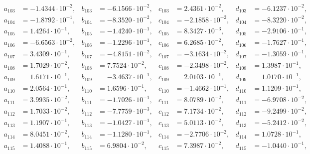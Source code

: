 \begin{align*}
  a_{ 103 } &= -1.4344 \cdot 10^{ -2 }, & b_{ 103 } &= -6.1566 \cdot 10^{ -2 }, & c_{ 103 } &= 2.4361 \cdot 10^{ -2 }, & d_{ 103 } &= -6.1237 \cdot 10^{ -2 }, \\ 
  a_{ 104 } &= -1.8792 \cdot 10^{ -1 }, & b_{ 104 } &= -8.3520 \cdot 10^{ -2 }, & c_{ 104 } &= -2.1858 \cdot 10^{ -2 }, & d_{ 104 } &= -8.3220 \cdot 10^{ -2 }, \\ 
  a_{ 105 } &= 1.4264 \cdot 10^{ -1 }, & b_{ 105 } &= -1.4240 \cdot 10^{ -1 }, & c_{ 105 } &= 8.3427 \cdot 10^{ -3 }, & d_{ 105 } &= -2.9106 \cdot 10^{ -1 }, \\ 
  a_{ 106 } &= -6.6563 \cdot 10^{ -2 }, & b_{ 106 } &= -1.2296 \cdot 10^{ -1 }, & c_{ 106 } &= 6.2685 \cdot 10^{ -2 }, & d_{ 106 } &= -1.7627 \cdot 10^{ -1 }, \\ 
  a_{ 107 } &= 3.4309 \cdot 10^{ -1 }, & b_{ 107 } &= -4.8151 \cdot 10^{ -2 }, & c_{ 107 } &= -3.1634 \cdot 10^{ -2 }, & d_{ 107 } &= -1.3059 \cdot 10^{ -1 }, \\ 
  a_{ 108 } &= 1.7029 \cdot 10^{ -2 }, & b_{ 108 } &= 7.7524 \cdot 10^{ -2 }, & c_{ 108 } &= -2.3498 \cdot 10^{ -2 }, & d_{ 108 } &= 1.3987 \cdot 10^{ -1 }, \\ 
  a_{ 109 } &= 1.6171 \cdot 10^{ -1 }, & b_{ 109 } &= -3.4637 \cdot 10^{ -1 }, & c_{ 109 } &= 2.0103 \cdot 10^{ -1 }, & d_{ 109 } &= 1.0170 \cdot 10^{ -1 }, \\ 
  a_{ 110 } &= 2.0564 \cdot 10^{ -1 }, & b_{ 110 } &= 1.6596 \cdot 10^{ -1 }, & c_{ 110 } &= -1.4662 \cdot 10^{ -1 }, & d_{ 110 } &= 1.1209 \cdot 10^{ -1 }, \\ 
  a_{ 111 } &= 3.9935 \cdot 10^{ -2 }, & b_{ 111 } &= -1.7026 \cdot 10^{ -1 }, & c_{ 111 } &= 8.0789 \cdot 10^{ -2 }, & d_{ 111 } &= -6.9708 \cdot 10^{ -2 }, \\ 
  a_{ 112 } &= 1.7033 \cdot 10^{ -2 }, & b_{ 112 } &= -7.7759 \cdot 10^{ -3 }, & c_{ 112 } &= 7.1734 \cdot 10^{ -2 }, & d_{ 112 } &= -9.2499 \cdot 10^{ -2 }, \\ 
  a_{ 113 } &= 1.1907 \cdot 10^{ -1 }, & b_{ 113 } &= -1.0427 \cdot 10^{ -1 }, & c_{ 113 } &= 5.0113 \cdot 10^{ -2 }, & d_{ 113 } &= -5.2412 \cdot 10^{ -2 }, \\ 
  a_{ 114 } &= 8.0451 \cdot 10^{ -2 }, & b_{ 114 } &= -1.1280 \cdot 10^{ -1 }, & c_{ 114 } &= -2.7706 \cdot 10^{ -2 }, & d_{ 114 } &= 1.0728 \cdot 10^{ -1 }, \\ 
  a_{ 115 } &= 1.4088 \cdot 10^{ -1 }, & b_{ 115 } &= 6.9804 \cdot 10^{ -2 }, & c_{ 115 } &= 7.3987 \cdot 10^{ -2 }, & d_{ 115 } &= -1.0440 \cdot 10^{ -1 }, \\ 

\end{align*}

